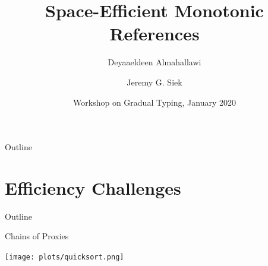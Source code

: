 \documentclass[12pt,dvipsnames]{beamer}
\title %
{Space-Efficient Monotonic References}
\author[Almahallawi, Siek] %
{Deyaaeldeen Almahallawi \and Jeremy G. Siek}
\institute[IU] %
{
  \inst{}%
  Luddy School of Informatics, Computing, and Engineering\\
  Indiana University Bloomington
}
\date[WGT 2020] %
{Workshop on Gradual Typing, January 2020}
\begin{document}
\begin{frame}
\maketitle
\end{frame}

\begin{frame}{Outline}
\tableofcontents
\end{frame}

\section{Efficiency Challenges}

\begin{frame}{Outline}
  \tableofcontents[currentsection]
\end{frame}

\begin{frame}[fragile]{Chains of Proxies}
    \begin{center}
    \texttt{[image: plots/quicksort.png]}
  \end{center}
\end{frame}

\end{document}
